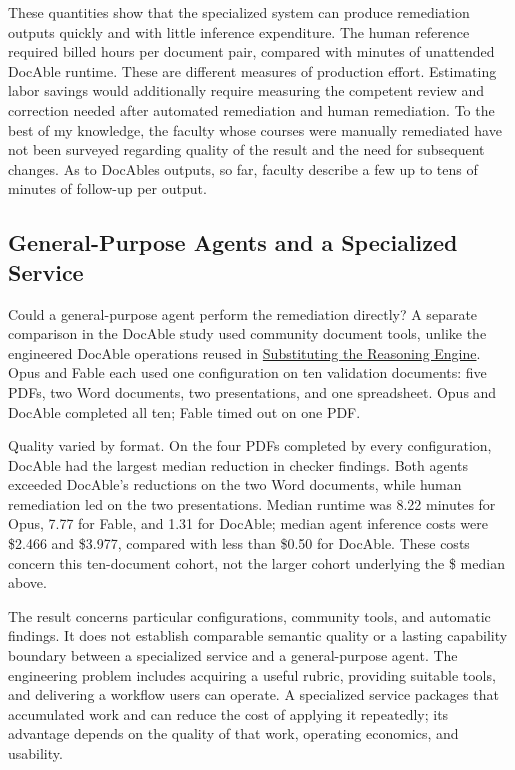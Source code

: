 These quantities show that the specialized system can produce remediation outputs quickly and with little inference expenditure. The human reference required  billed hours per document pair, compared with  minutes of unattended DocAble runtime. These are different measures of production effort. Estimating labor savings would additionally require measuring the competent review and correction needed after automated remediation and human remediation. To the best of my knowledge, the faculty whose courses were manually remediated have not been surveyed regarding quality of the result and the need for subsequent changes. As to DocAble\textquotesingle s outputs, so far, faculty describe a few up to tens of minutes of follow-up per output.

\subsection{General-Purpose Agents and a Specialized Service}\label{heading:agents-and-specialized-service}


Could a general-purpose agent perform the remediation directly? A separate comparison in the DocAble study used community document tools, unlike the engineered DocAble operations reused in \hyperref[exploring-alternative-reasoning-engines]{Substituting the Reasoning Engine}. Opus and Fable each used one configuration on ten validation documents: five PDFs, two Word documents, two presentations, and one spreadsheet. Opus and DocAble completed all ten; Fable timed out on one PDF.

Quality varied by format. On the four PDFs completed by every configuration, DocAble had the largest median reduction in checker findings. Both agents exceeded DocAble's reductions on the two Word documents, while human remediation led on the two presentations. Median runtime was 8.22 minutes for Opus, 7.77 for Fable, and 1.31 for DocAble; median agent inference costs were \$2.466 and \$3.977, compared with less than \$0.50 for DocAble. These costs concern this ten-document cohort, not the larger cohort underlying the \$ median above.

The result concerns particular configurations, community tools, and automatic findings. It does not establish comparable semantic quality or a lasting capability boundary between a specialized service and a general-purpose agent. The engineering problem includes acquiring a useful rubric, providing suitable tools, and delivering a workflow users can operate. A specialized service packages that accumulated work and can reduce the cost of applying it repeatedly; its advantage depends on the quality of that work, operating economics, and usability.

